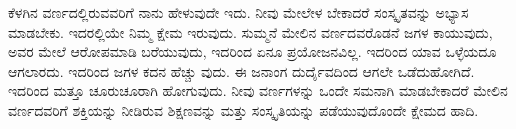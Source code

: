 ಕೆಳಗಿನ ವರ್ಣದಲ್ಲಿರುವವರಿಗೆ ನಾನು ಹೇಳುವುದೇ ಇದು. ನೀವು ಮೇಲೇಳ ಬೇಕಾದರೆ ಸಂಸ್ಕೃತವನ್ನು ಅಭ್ಯಾಸ ಮಾಡಬೇಕು. ಇದರಲ್ಲಿಯೇ ನಿಮ್ಮ ಕ್ಷೇಮ ಇರುವುದು. ಸುಮ್ಮನೆ ಮೇಲಿನ ವರ್ಣದವರೊಡನೆ ಜಗಳ ಕಾಯುವುದು, ಅವರ ಮೇಲೆ ಆರೋಪಮಾಡಿ ಬರೆಯುವುದು, ಇದರಿಂದ ಏನೂ ಪ್ರಯೋಜನವಿಲ್ಲ. ಇದರಿಂದ ಯಾವ ಒಳ್ಳೆಯದೂ ಆಗಲಾರದು. ಇದರಿಂದ ಜಗಳ ಕದನ ಹೆಚ್ಚು ವುದು. ಈ ಜನಾಂಗ ದುರ್ದೈವದಿಂದ ಆಗಲೇ ಒಡೆದುಹೋಗಿದೆ. ಇದರಿಂದ ಮತ್ತೂ ಚೂರುಚೂರಾಗಿ ಹೋಗುವುದು. ನೀವು ವರ್ಣಗಳನ್ನು ಒಂದೇ ಸಮನಾಗಿ ಮಾಡಬೇಕಾದರೆ ಮೇಲಿನ ವರ್ಣದವರಿಗೆ ಶಕ್ತಿಯನ್ನು ನೀಡಿರುವ ಶಿಕ್ಷಣವನ್ನು ಮತ್ತು ಸಂಸ್ಕೃತಿಯನ್ನು ಪಡೆಯುವುದೊಂದೇ ಕ್ಷೇಮದ ಹಾದಿ.


